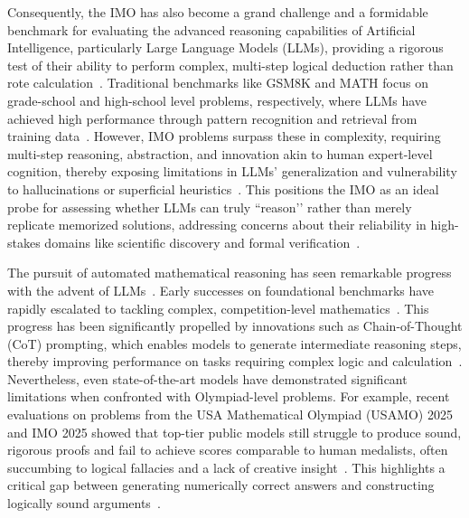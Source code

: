 \documentclass[12pt]{article}
\begin{document}
Consequently, the IMO has also become a grand challenge and a formidable benchmark for evaluating the advanced reasoning capabilities of Artificial Intelligence, particularly Large Language Models (LLMs), providing a rigorous test of their ability to perform complex, multi-step logical deduction rather than rote calculation~\cite{han2024olympiadbench, trinh2024alphageometry, matharena2025}. Traditional benchmarks like GSM8K and MATH focus on grade-school and high-school level problems, respectively, where LLMs have achieved high performance through pattern recognition and retrieval from training data~\cite{cobbe2021gsm8k,hendrycks2021math}. However, IMO problems surpass these in complexity, requiring multi-step reasoning, abstraction, and innovation akin to human expert-level cognition, thereby exposing limitations in LLMs’ generalization and vulnerability to hallucinations or superficial heuristics~\cite{frontiermath2024}. This positions the IMO as an ideal probe for assessing whether LLMs can truly ``reason’’ rather than merely replicate memorized solutions, addressing concerns about their reliability in high-stakes domains like scientific discovery and formal verification~\cite{li2025advocate}.

The pursuit of automated mathematical reasoning has seen remarkable progress with the advent of LLMs~\cite{ahn2024large, wang2025survey}. Early successes on foundational benchmarks have rapidly escalated to tackling complex, competition-level mathematics~\cite{liao2023mathagent}. This progress has been significantly propelled by innovations such as Chain-of-Thought (CoT) prompting, which enables models to generate intermediate reasoning steps, thereby improving performance on tasks requiring complex logic and calculation~\cite{wei2022chain}. Nevertheless, even state-of-the-art models have demonstrated significant limitations when confronted with Olympiad-level problems. For example, recent evaluations on problems from the USA Mathematical Olympiad (USAMO) 2025 and IMO 2025 showed that top-tier public models still struggle to produce sound, rigorous proofs and fail to achieve scores comparable to human medalists, often succumbing to logical fallacies and a lack of creative insight~\cite{petrov2025proof, matharena2025}. This highlights a critical gap between generating numerically correct answers and constructing logically sound arguments~\cite{mahdavi2025brains}.
\end{document}

